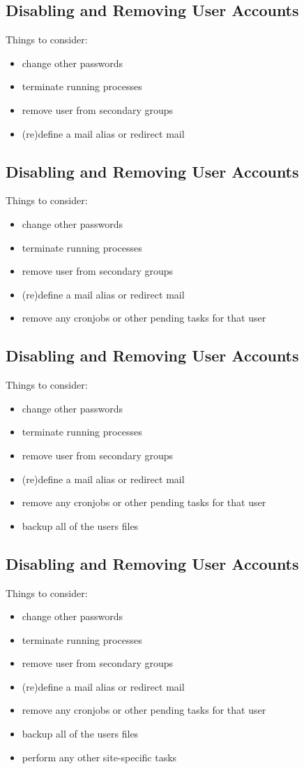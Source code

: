 \documentclass[xga]{xdvislides}
\begin{document}
\subsection{Disabling and Removing User Accounts}
Things to consider:
\begin{itemize}
	\item change other passwords
	\item terminate running processes
	\item remove user from secondary groups
	\item (re)define a mail alias or redirect mail
\end{itemize}

\subsection{Disabling and Removing User Accounts}
Things to consider:
\begin{itemize}
	\item change other passwords
	\item terminate running processes
	\item remove user from secondary groups
	\item (re)define a mail alias or redirect mail
	\item remove any cronjobs or other pending tasks for that user
\end{itemize}

\subsection{Disabling and Removing User Accounts}
Things to consider:
\begin{itemize}
	\item change other passwords
	\item terminate running processes
	\item remove user from secondary groups
	\item (re)define a mail alias or redirect mail
	\item remove any cronjobs or other pending tasks for that user
	\item backup all of the users files
\end{itemize}

\subsection{Disabling and Removing User Accounts}
Things to consider:
\begin{itemize}
	\item change other passwords
	\item terminate running processes
	\item remove user from secondary groups
	\item (re)define a mail alias or redirect mail
	\item remove any cronjobs or other pending tasks for that user
	\item backup all of the users files
	\item perform any other site-specific tasks
\end{itemize}
\end{document}
